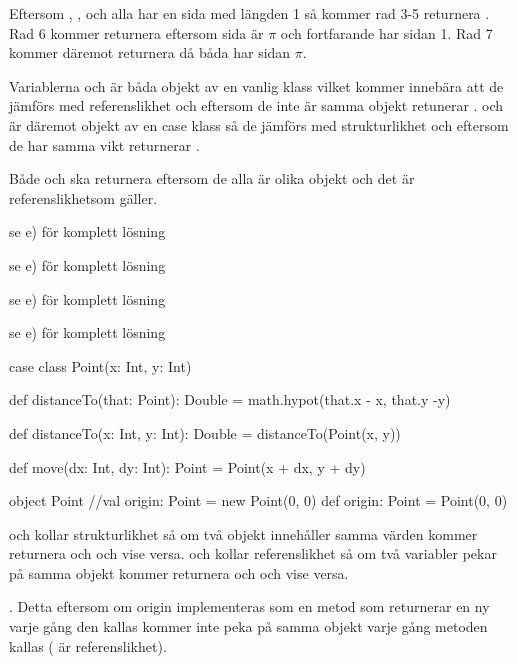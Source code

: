 Eftersom , ,  och  alla har en sida med längden 1 så kommer rad 3-5 returnera . Rad 6 kommer returnera  eftersom  sida är $\pi$ och  fortfarande har sidan 1. Rad 7 kommer däremot returnera  då båda har sidan $\pi$.

\Task %

\Subtask Variablerna  och  är båda objekt av en vanlig klass vilket kommer innebära att de jämförs med referenslikhet och eftersom de inte är samma objekt retunerar \code{==} .  och  är däremot objekt av en case klass så de jämförs med strukturlikhet och eftersom de har samma vikt returnerar \code{==} .

\Subtask Både  och  ska returnera  eftersom de alla är olika objekt och det är referenslikhetsom gäller.

\Task %

\Subtask se e) för komplett lösning

\Subtask se e) för komplett lösning

\Subtask se e) för komplett lösning

\Subtask se e) för komplett lösning

\Subtask \begin{CodeSmall}
case class Point(x: Int, y: Int) {
	
	def distanceTo(that: Point): Double = math.hypot(that.x - x, that.y -y)
	
	def distanceTo(x: Int, y: Int): Double = distanceTo(Point(x, y))
	
	def move(dx: Int, dy: Int): Point = Point(x + dx, y + dy)
}

object Point {
	//val origin: Point = new Point(0, 0)
	def origin: Point = Point(0, 0)
}
\end{CodeSmall}

\Subtask \code{==} och \code{!=} kollar strukturlikhet så om två objekt innehåller samma värden kommer \code{==} returnera  och \code{!=}  och vise versa.  och  kollar referenslikhet så om två variabler pekar på samma objekt kommer  returnera  och   och vise versa.

\Subtask {}. Detta eftersom om origin implementeras som en metod som returnerar en ny  varje gång den kallas kommer  inte peka på samma objekt varje gång metoden kallas ( är referenslikhet).

